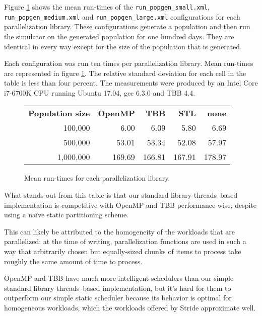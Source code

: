Figure \ref{fig:parallelization-mean-runtimes} shows the mean run-times of the \texttt{run\_popgen\_small.xml}, \texttt{run\_popgen\_medium.xml} and \texttt{run\_popgen\_large.xml} configurations for each parallelization library. These configurations generate a population and then run the simulator on the generated population for one hundred days. They are identical in every way except for the size of the population that is generated.

Each configuration was run ten times per parallelization library. Mean run-times are represented in figure \ref{fig:parallelization-mean-runtimes}. The relative standard deviation for each cell in the table is less than four percent. The measurements were produced by an Intel Core i7-6700K CPU running Ubuntu 17.04, gcc 6.3.0 and TBB 4.4.

\begin{figure}[h]
	\begin{tabular}{r|r|r|r|r}
		\textbf{Population size} & \textbf{OpenMP} & \textbf{TBB} & \textbf{STL} & \textbf{none} \\
		100,000 & 6.00 & 6.09 & 5.80 & 6.69 \\
		500,000 & 53.01 & 53.34 & 52.08 & 57.97 \\
		1,000,000 & 169.69 & 166.81 & 167.91 & 178.97
	\end{tabular}
	\label{fig:parallelization-mean-runtimes}
	\caption{Mean run-times for each parallelization library.}
\end{figure}

What stands out from this table is that our standard library threads--based implementation is competitive with OpenMP and TBB performance-wise, despite using a na\"ive static partitioning scheme.

This can likely be attributed to the homogeneity of the workloads that are parallelized: at the time of writing, parallelization functions are used in such a way that arbitrarily chosen but equally-sized chunks of items to process take roughly the same amount of time to process.

OpenMP and TBB have much more intelligent schedulers than our simple standard library threads--based implementation, but it's hard for them to outperform our simple static scheduler because its behavior is optimal for homogeneous workloads, which the workloads offered by Stride approximate well.